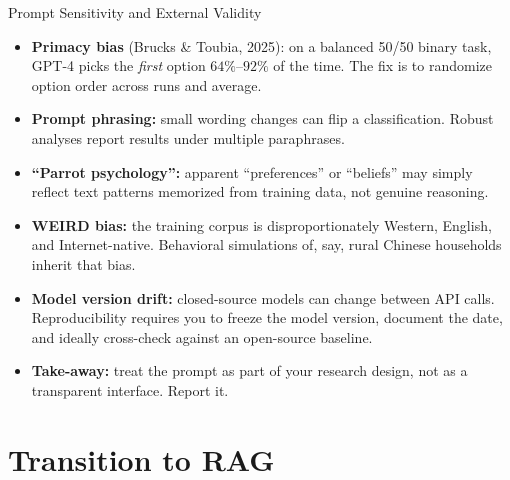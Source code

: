 \documentclass[10pt,english,aspectratio=169]{beamer}
\begin{document}
\begin{frame}{Prompt Sensitivity and External Validity}
\begin{itemize}
\item \textbf{Primacy bias} (Brucks \& Toubia, 2025): on a balanced 50/50 binary task, GPT-4 picks the \emph{first} option $64\%$--$92\%$ of the time. The fix is to randomize option order across runs and average.

\medskip
\item \textbf{Prompt phrasing:} small wording changes can flip a classification. Robust analyses report results under multiple paraphrases.

\medskip
\item \textbf{``Parrot psychology'':} apparent ``preferences'' or ``beliefs'' may simply reflect text patterns memorized from training data, not genuine reasoning.

\medskip
\item \textbf{WEIRD bias:} the training corpus is disproportionately Western, English, and Internet-native. Behavioral simulations of, say, rural Chinese households inherit that bias.

\medskip
\item \textbf{Model version drift:} closed-source models can change between API calls. Reproducibility requires you to freeze the model version, document the date, and ideally cross-check against an open-source baseline.

\medskip
\item \textbf{Take-away:} treat the prompt as part of your research design, not as a transparent interface. Report it.
\end{itemize}
\end{frame}

\section{Transition to RAG}
\end{document}
